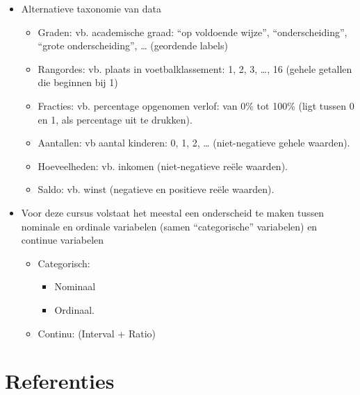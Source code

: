 \documentclass[]{tufte-book}
\providecommand{\tightlist}{%
  \setlength{\itemsep}{0pt}\setlength{\parskip}{0pt}}
\begin{document}
\begin{itemize}
\tightlist
\item
  Alternatieve taxonomie van data

  \begin{itemize}
  \tightlist
  \item
    Graden: vb. academische graad: ``op voldoende wijze'', ``onderscheiding'', ``grote onderscheiding'', \ldots{} (geordende labels)
  \item
    Rangordes: vb. plaats in voetbalklassement: 1, 2, 3, \ldots, 16 (gehele getallen die beginnen bij 1)
  \item
    Fracties: vb. percentage opgenomen verlof: van 0\% tot 100\% (ligt tussen 0 en 1, als percentage uit te drukken).
  \item
    Aantallen: vb aantal kinderen: 0, 1, 2, \ldots{} (niet-negatieve gehele waarden).
  \item
    Hoeveelheden: vb. inkomen (niet-negatieve reële waarden).
  \item
    Saldo: vb. winst (negatieve en positieve reële waarden).
  \end{itemize}
\item
  Voor deze cursus volstaat het meestal een onderscheid te maken tussen nominale en ordinale variabelen (samen ``categorische'' variabelen) en continue variabelen

  \begin{itemize}
  \tightlist
  \item
    Categorisch:

    \begin{itemize}
    \tightlist
    \item
      Nominaal
    \item
      Ordinaal.
    \end{itemize}
  \item
    Continu: (Interval + Ratio)
  \end{itemize}
\end{itemize}

\hypertarget{referenties}{%
\section{Referenties}\label{referenties}}
\end{document}
